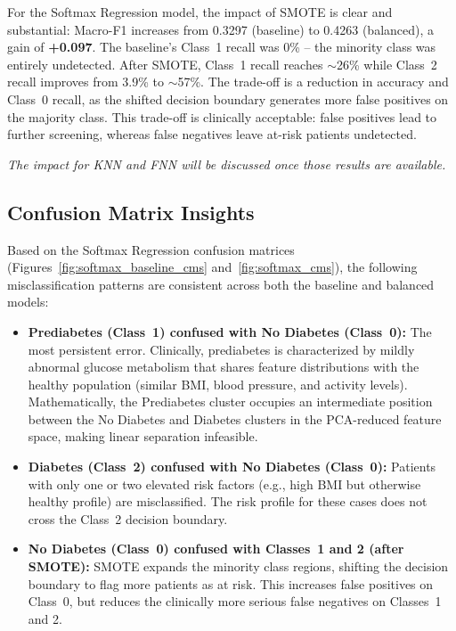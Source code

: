\documentclass[12pt,a4paper]{article}
\begin{document}
For the Softmax Regression model, the impact of SMOTE is clear and substantial: Macro-F1 increases from 0.3297 (baseline) to 0.4263 (balanced), a gain of \textbf{+0.097}. The baseline's Class~1 recall was 0\% -- the minority class was entirely undetected. After SMOTE, Class~1 recall reaches $\sim$26\% while Class~2 recall improves from 3.9\% to $\sim$57\%. The trade-off is a reduction in accuracy and Class~0 recall, as the shifted decision boundary generates more false positives on the majority class. This trade-off is clinically acceptable: false positives lead to further screening, whereas false negatives leave at-risk patients undetected.

\textit{The impact for KNN and FNN will be discussed once those results are available.}

\subsection{Confusion Matrix Insights}

Based on the Softmax Regression confusion matrices (Figures~\ref{fig:softmax_baseline_cms} and~\ref{fig:softmax_cms}), the following misclassification patterns are consistent across both the baseline and balanced models:

\begin{itemize}
    \item \textbf{Prediabetes (Class~1) confused with No Diabetes (Class~0):} The most persistent error. Clinically, prediabetes is characterized by mildly abnormal glucose metabolism that shares feature distributions with the healthy population (similar BMI, blood pressure, and activity levels). Mathematically, the Prediabetes cluster occupies an intermediate position between the No Diabetes and Diabetes clusters in the PCA-reduced feature space, making linear separation infeasible.

    \item \textbf{Diabetes (Class~2) confused with No Diabetes (Class~0):} Patients with only one or two elevated risk factors (e.g., high BMI but otherwise healthy profile) are misclassified. The risk profile for these cases does not cross the Class~2 decision boundary.

    \item \textbf{No Diabetes (Class~0) confused with Classes~1 and 2 (after SMOTE):} SMOTE expands the minority class regions, shifting the decision boundary to flag more patients as at risk. This increases false positives on Class~0, but reduces the clinically more serious false negatives on Classes~1 and 2.
\end{itemize}
\end{document}
